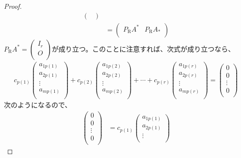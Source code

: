 \documentclass[dvipdfmx]{jsarticle}
\begin{document}
\begin{proof}
\begin{align*}
\begin{pmatrix}
\end{pmatrix}\\
&= \begin{pmatrix}
P_{\mathrm{R}}A^{*} & P_{\mathrm{R}}A_{*} \\
\end{pmatrix}
\end{align*}
$P_{\mathrm{R}}A^{*} = \begin{pmatrix}
I_{r} \\
O \\
\end{pmatrix}$が成り立つ。このことに注意すれば、次式が成り立つなら、
\begin{align*}
c_{p(1)}\begin{pmatrix}
a_{1p(1)} \\
a_{2p(1)} \\
 \vdots \\
a_{mp(1)} \\
\end{pmatrix} + c_{p(2)}\begin{pmatrix}
a_{1p(2)} \\
a_{2p(2)} \\
 \vdots \\
a_{mp(2)} \\
\end{pmatrix} + \cdots + c_{p(r)}\begin{pmatrix}
a_{1p(r)} \\
a_{2p(r)} \\
 \vdots \\
a_{mp(r)} \\
\end{pmatrix} = \begin{pmatrix}
0 \\
0 \\
 \vdots \\
0 \\
\end{pmatrix}
\end{align*}
次のようになるので、
\begin{align*}
\begin{pmatrix}
0 \\
0 \\
 \vdots \\
0 \\
\end{pmatrix} &= c_{p(1)}\begin{pmatrix}
a_{1p(1)} \\
a_{2p(1)} \\
 \vdots \\

\end{pmatrix}
\end{align*}
\end{proof}
\end{document}
